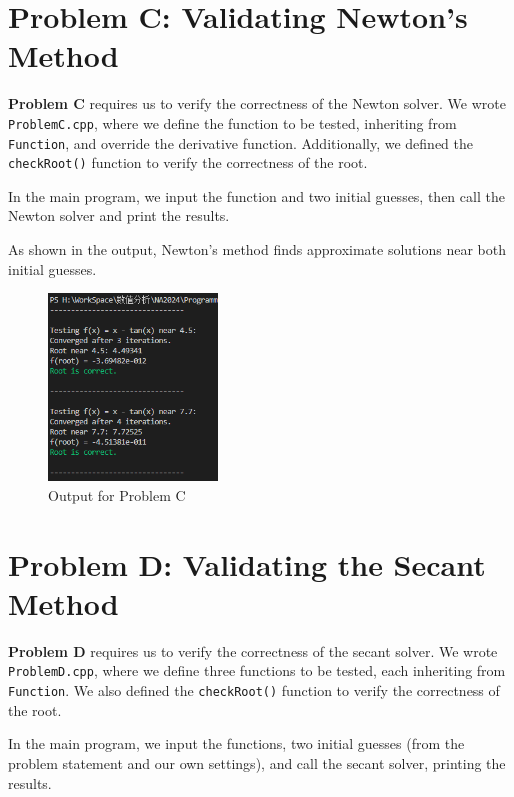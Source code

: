 \documentclass[a4paper]{article}
\begin{document}
\section{Problem C: Validating Newton's Method}

\textbf{Problem C} requires us to verify the correctness of the Newton solver. We wrote \texttt{ProblemC.cpp}, where we define the function to be tested, inheriting from \texttt{Function}, and override the derivative function. Additionally, we defined the \texttt{checkRoot()} function to verify the correctness of the root.

In the main program, we input the function and two initial guesses, then call the Newton solver and print the results. 

As shown in the output, Newton's method finds approximate solutions near both initial guesses.

\begin{figure}[H]  %
  \centering
  \includegraphics[width=0.4\textwidth]{./picture/ProblemC.png}
  \caption{Output for Problem C}
\end{figure}

\section{Problem D: Validating the Secant Method}

\textbf{Problem D} requires us to verify the correctness of the secant solver. We wrote \texttt{ProblemD.cpp}, where we define three functions to be tested, each inheriting from \texttt{Function}. We also defined the \texttt{checkRoot()} function to verify the correctness of the root.

In the main program, we input the functions, two initial guesses (from the problem statement and our own settings), and call the secant solver, printing the results.
\end{document}
